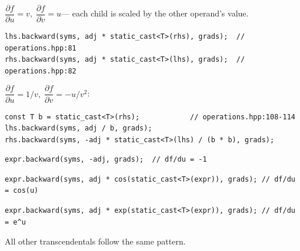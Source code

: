 \documentclass[11pt,a4paper]{article}
\newcommand{\pf}[2]{\dfrac{\partial #1}{\partial #2}}
\begin{document}
\begin{tcolorbox}[defbox={{MultiplyOp: $f = u \cdot v$}}]
$\pf{f}{u} = v,\;\pf{f}{v} = u$\;--- each child is scaled by the other operand's value.
\begin{lstlisting}
lhs.backward(syms, adj * static_cast<T>(rhs), grads);  // operations.hpp:81
rhs.backward(syms, adj * static_cast<T>(lhs), grads);  // operations.hpp:82
\end{lstlisting}
\end{tcolorbox}

\begin{tcolorbox}[defbox={{DivideOp: $f = u / v$}}]
$\pf{f}{u} = 1/v,\;\pf{f}{v} = -u/v^2$:
\begin{lstlisting}
const T b = static_cast<T>(rhs);            // operations.hpp:108-114
lhs.backward(syms, adj / b, grads);
rhs.backward(syms, -adj * static_cast<T>(lhs) / (b * b), grads);
\end{lstlisting}
\end{tcolorbox}

\begin{tcolorbox}[defbox={{NegateOp: $f = -u$}}]
\begin{lstlisting}
expr.backward(syms, -adj, grads);  // df/du = -1
\end{lstlisting}
\end{tcolorbox}

\begin{tcolorbox}[defbox={{SineOp: $f = \sin(u)$}}]
\begin{lstlisting}
expr.backward(syms, adj * cos(static_cast<T>(expr)), grads); // df/du = cos(u)
\end{lstlisting}
\end{tcolorbox}

\begin{tcolorbox}[defbox={{ExpOp: $f = e^u$}}]
\begin{lstlisting}
expr.backward(syms, adj * exp(static_cast<T>(expr)), grads); // df/du = e^u
\end{lstlisting}
\end{tcolorbox}

\noindent All other transcendentals follow the same pattern.
\end{document}
